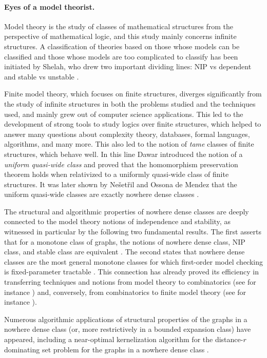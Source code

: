 \paragraph*{Eyes of a model theorist.}
Model theory  is the study of classes of mathematical structures from the perspective of mathematical logic, and this study mainly concerns infinite structures.
A classification of theories based on those whose models can be classified and those whose models are too complicated to classify has been initiated by Shelah, who  drew two important dividing lines: NIP vs dependent and stable vs unstable \cite{shelah1990classification}.

Finite model theory, which focuses on finite structures,  diverges significantly from the study of infinite structures in both the problems studied and the techniques used, and mainly grew out of computer science applications.  This led to the development of strong tools to study logics over finite structures, which helped to answer many questions about  complexity theory, databases, formal languages, algorithms, and many more. This also led to the notion of {\em tame} classes of finite structures, which behave well.  In this line Dawar \cite{Dawar2010} introduced the notion of a \emph{uniform quasi-wide class} and proved 
     that the homomorphism preservation theorem holds when relativized to a uniformly quasi-wide class of finite structures. It was later shown 
by Ne\v{s}et\v{r}il and Ossona de Mendez  that the uniform quasi-wide classes are exactly nowhere dense classes \cite{ND_logic}.

The  structural and algorithmic properties of  nowhere dense classes  are deeply connected to  the model theory notions of independence and stability, as witnessed in particular by the following two fundamental results. The first asserts that for a monotone class of graphs, the notions of nowhere dense class, NIP class, and stable class are equivalent \cite{adler2014interpreting}. The second states that nowhere dense classes are the most general monotone classes for which first-order model checking is fixed-parameter tractable \cite{grohe2017deciding}. This connection has already proved its efficiency in transferring techniques and notions from model theory to combinatorics (see for instance \cite{pilipczuk2018number}) and, conversely, from combinatorics to finite model theory (see for instance \cite{rossman2008homomorphism}).

Numerous algorithmic applications of structural properties of the graphs in a nowhere dense class (or, more restrictively in a bounded expansion class) have appeared, including   a near-optimal kernelization algorithm for the distance-$r$ dominating set problem for the graphs in a nowhere dense class \cite{eickmeyer2016neighborhood}.

